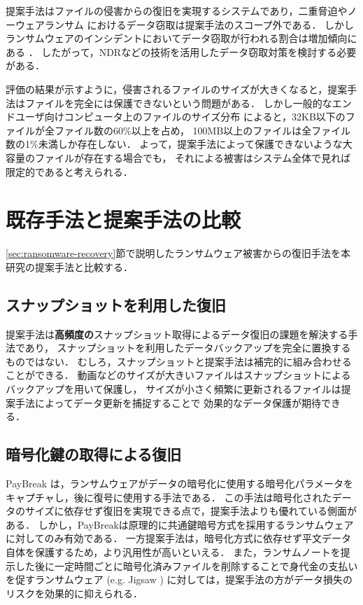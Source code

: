 提案手法はファイルの侵害からの復旧を実現するシステムであり，二重脅迫やノーウェアランサム \cite{nowhere-ransom} におけるデータ窃取は提案手法のスコープ外である．
しかしランサムウェアのインシデントにおいてデータ窃取が行われる割合は増加傾向にある \cite{sophos-report:online}．
したがって，NDRなどの技術を活用したデータ窃取対策を検討する必要がある．

評価の結果が示すように，侵害されるファイルのサイズが大きくなると，提案手法はファイルを完全には保護できないという問題がある．
しかし一般的なエンドユーザ向けコンピュータ上のファイルのサイズ分布 \cite{file-size-dist} によると，32KB以下のファイルが全ファイル数の60\%以上を占め，
100MB以上のファイルは全ファイル数の1\%未満しか存在しない．
よって，提案手法によって保護できないような大容量のファイルが存在する場合でも，
それによる被害はシステム全体で見れば限定的であると考えられる．


\section{既存手法と提案手法の比較}
\ref{sec:ransomware-recovery}節で説明したランサムウェア被害からの復旧手法を本研究の提案手法と比較する．
\subsection{スナップショットを利用した復旧}
提案手法は\textbf{高頻度の}スナップショット取得によるデータ復旧の課題を解決する手法であり，
スナップショットを利用したデータバックアップを完全に置換するものではない．
むしろ，スナップショットと提案手法は補完的に組み合わせることができる．
動画などのサイズが大きいファイルはスナップショットによるバックアップを用いて保護し，
サイズが小さく頻繁に更新されるファイルは提案手法によってデータ更新を捕捉することで
効果的なデータ保護が期待できる．

\subsection{暗号化鍵の取得による復旧}
PayBreak \cite{kolodenker2017paybreak}は，ランサムウェアがデータの暗号化に使用する暗号化パラメータをキャプチャし，後に復号に使用する手法である．
この手法は暗号化されたデータのサイズに依存せず復旧を実現できる点で，提案手法よりも優れている側面がある．
しかし，PayBreakは原理的に共通鍵暗号方式を採用するランサムウェアに対してのみ有効である．
一方提案手法は，暗号化方式に依存せず平文データ自体を保護するため，より汎用性が高いといえる．
また，ランサムノートを提示した後に一定時間ごとに暗号化済みファイルを削除することで身代金の支払いを促すランサムウェア (e.g. Jigsaw \cite{byrne2017jigsaw})
に対しては，提案手法の方がデータ損失のリスクを効果的に抑えられる．

